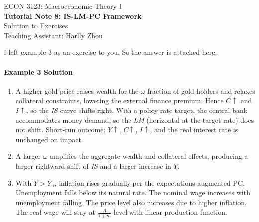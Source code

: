 \documentclass[12pt]{article}
\begin{document}
\begin{center}
    ECON 3123: Macroeconomic Theory I\\
    {\large \textbf{Tutorial Note 8: IS-LM-PC Framework}}\\
    Solution to Exercises\\
    Teaching Assistant: Harlly Zhou
\end{center}

I left example 3 as an exercise to you. So the answer is attached here.
\paragraph{Example 3 Solution}
\begin{enumerate}[label=(\arabic*)]

    \item A higher gold price raises wealth for the $\omega$ fraction of gold holders and relaxes collateral constraints, lowering the external finance premium. Hence $C\uparrow$ and $I\uparrow$, so the \emph{IS} curve shifts right. With a policy rate target, the central bank accommodates money demand, so the \emph{LM} (horizontal at the target rate) does not shift. Short-run outcome: $Y\uparrow$, $C\uparrow$, $I\uparrow$, and the real interest rate is unchanged on impact.
    
    \item A larger $\omega$ amplifies the aggregate wealth and collateral effects, producing a larger rightward shift of \emph{IS} and a larger increase in $Y$.
    
    \item With $Y>Y_n$, inflation rises gradually per the expectations-augmented PC. Unemployment falls below its natural rate. The nominal wage increases with unemployment falling. The price level also increases due to higher inflation. The real wage will stay at $\frac{A}{1+m}$ level with linear production function.
    

\end{enumerate}
\end{document}

